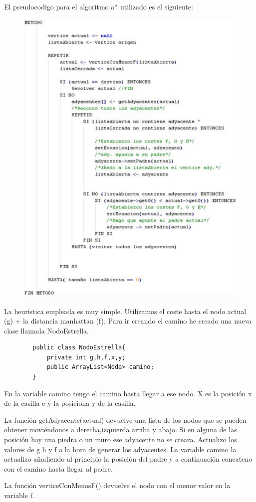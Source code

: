\documentclass[titlepage]{article}
\begin{document}
	El pseudocodigo para el algoritmo a* utilizado es el siguiente:
	\begin{figure}[H]
		\centering
		\includegraphics[width=0.7\linewidth]{screenshot001}
		
		\label{fig:screenshot001}
	\end{figure}

	La heuristica empleada es muy simple. Utilizamos el coste hasta el nodo actual (g) + la distancia manhattan (f). 
	Para ir creando el camino he creado una nueva clase llamada NodoEstrella.
	\begin{lstlisting}
		public class NodoEstrella{
			private int g,h,f,x,y;
			public ArrayList<Node> camino;
		}
	\end{lstlisting}
	
	En la variable camino tengo el camino hasta llegar a ese nodo.
	X es la posición x de la casilla e y la posiciona y de la casilla.
	
	La función getAdyacente(actual) devuelve una lista de los nodos que se pueden obtener moviéndonos a derecha,izquierda arriba y abajo. Si en alguna de las posición hay una piedra o un muro ese adyacente no se creara. Actualizo los valores de g h y f a la hora de generar los adyacentes.
	La variable camino la actualizo añadiendo al principio la posición del padre y a continuación concateno con el camino hasta llegar al padre.
	
	La función verticeConMenosF() devuelve el nodo con el menor valor en la variable f.
	
\end{document}
